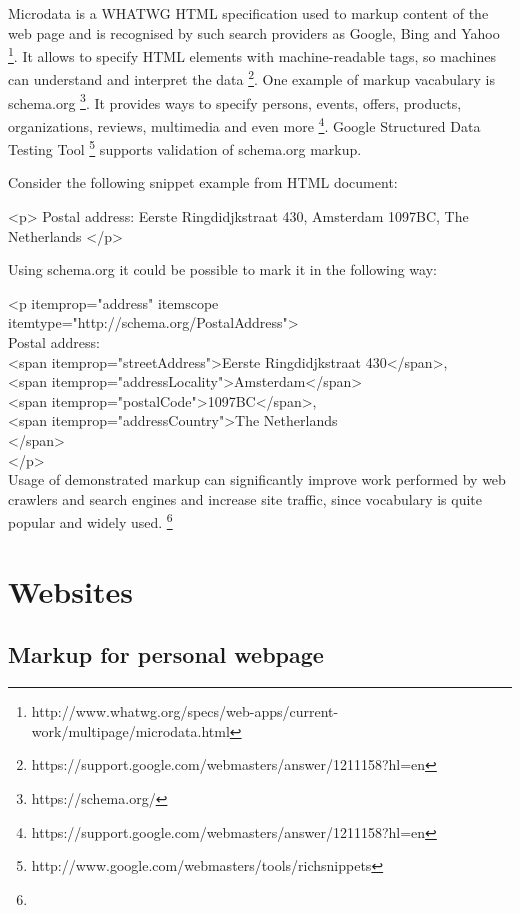 \documentclass{acm_proc_10ptArticle-sp}
\begin{document}
Microdata is a WHATWG HTML specification used to markup content of the web page and is recognised by such search providers as Google, Bing and Yahoo \footnote{http://www.whatwg.org/specs/web-apps/current-work/multipage/microdata.html}. It allows to specify HTML elements with machine-readable tags, so machines can understand and interpret the data \footnote{https://support.google.com/webmasters/answer/1211158?hl=en}. One example of markup vacabulary is schema.org \footnote{https://schema.org/}. It provides ways to specify persons, events, offers, products, organizations, reviews, multimedia and even more \footnote{https://support.google.com/webmasters/answer/1211158?hl=en}. Google Structured Data Testing Tool \footnote{http://www.google.com/webmasters/tools/richsnippets} supports validation of schema.org markup.

Consider the following snippet example from HTML document:

 <p> Postal address: Eerste Ringdidjkstraat 430, Amsterdam 1097BC, The Netherlands </p>

Using schema.org it could be possible to mark it in the following way:

<p itemprop="address" itemscope \\itemtype="http://schema.org/PostalAddress">\\
	Postal address:\\
	<span itemprop="streetAddress">Eerste Ringdidjkstraat 430</span>,\\
	<span itemprop="addressLocality">Amsterdam</span>\\
	<span itemprop="postalCode">1097BC</span>,\\
	<span itemprop="addressCountry">The Netherlands\\</span>\\
</p>\\

Usage of demonstrated markup can significantly improve work performed by web crawlers and search engines and increase site traffic, since vocabulary is quite popular and widely used. \footnote{}

\section{Websites}

\subsection{Markup for personal webpage}
\end{document}
